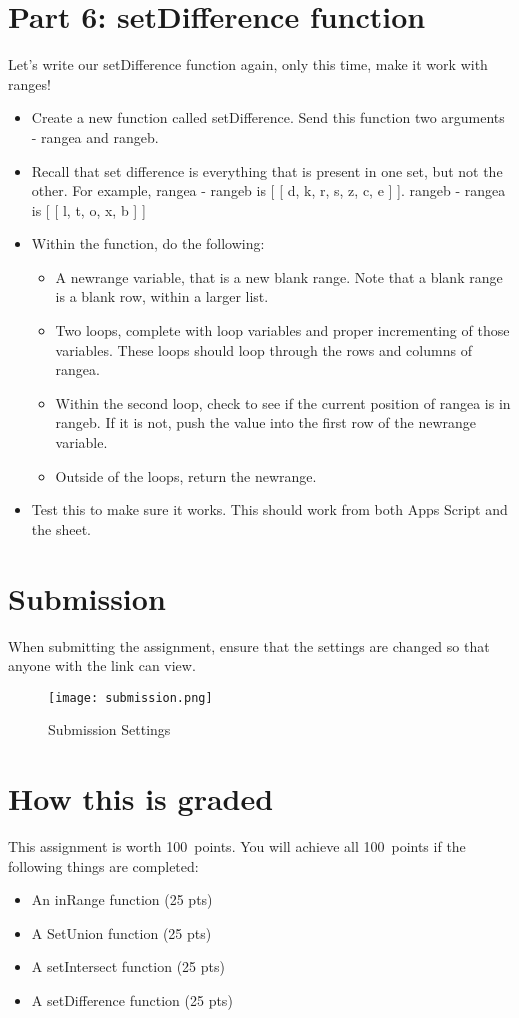 \documentclass{article}
\newcommand{\AValue}{100}
\begin{document}
\section*{Part 6: setDifference function}
Let's write our setDifference function again, only this time, make it work with ranges!
\begin{itemize}
    \item Create a new function called setDifference.  Send this function two arguments - rangea and rangeb.
    \item Recall that set difference is everything that is present in one set, but not the other.  For example, rangea - rangeb is [ [ d,	k,	r,	s,	z,	c,	e ] ].  rangeb - rangea is [ [ l, t,	o,	x,	b ] ]
    \item Within the function, do the following:
    \begin{itemize}
    		\item A newrange variable, that is a new blank range.  Note that a blank range is a blank row, within a larger list.
    		\item Two loops, complete with loop variables and proper incrementing of those variables.  These loops should loop through the rows and columns of rangea.
    		\item Within the second loop, check to see if the current position of rangea is in rangeb.  If it is not, push the value into the first row of the newrange variable.
    		\item Outside of the loops, return the newrange.
    	\end{itemize}
    	\item Test this to make sure it works.  This should work from both Apps Script and the sheet.
\end{itemize}

\section*{Submission}
When submitting the assignment, ensure that the settings are changed so that anyone with the link can view.
\begin{figure}[H]
  \centering
  \texttt{[image: submission.png]}
  \caption{Submission Settings}
\end{figure}

\section*{How this is graded}
This assignment is worth \AValue \ points. You will achieve all \AValue \   points if the following things are completed:
\begin{itemize}
    \item An inRange function (25 pts)
    \item A SetUnion function (25 pts)
    \item A setIntersect function (25 pts)
    \item A setDifference function (25 pts)
\end{itemize}
\end{document}
